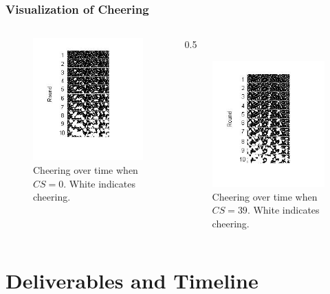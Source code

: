 \documentclass[compress,handout,10pt]{beamer}
\begin{document}
\begin{frame}
    \frametitle{Visualization of Cheering}
    \begin {columns}
    	\begin{column}{0.5\textwidth}
    		\begin{figure}
    		\begin{center}
    		  \includegraphics [width=2in] {n=0,46.jpg}
    			\caption {{\tiny Cheering over time when $CS=0$. White indicates cheering.}}
    			\end{center}
    		\end{figure}
    	\end {column}
    	\begin {column}{0.5\textwidth}
    	\begin{figure} [h]
    		\begin{center}
    			\includegraphics [width=2in] {n=39,46.jpg}
    			\caption {{\tiny Cheering over time when $CS=39$. White indicates cheering.}}
    		\end{center}
    	\end {figure}	
    	\end {column}
    \end{columns}
\end{frame}

\section {Deliverables and Timeline}
\end{document}

